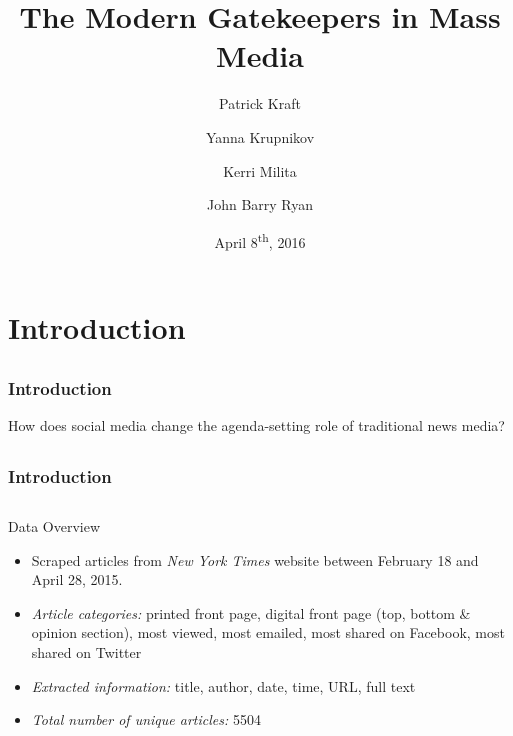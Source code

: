 \documentclass{beamer}
\author[Kraft/Krupnikov/Milita/Ryan]{Patrick Kraft \and Yanna Krupnikov \and Kerri Milita \and John Barry Ryan}
\institute[]{74\textsuperscript{th} MPSA Annual Conference, Chicago, Il}
\title[The Modern Gatekeepers in Mass Media]{The Modern Gatekeepers in Mass Media}
\date{April 8\textsuperscript{th}, 2016}
\begin{document}
\frame{\titlepage}


\section{Introduction}
\subsection{}
\begin{frame}%
\frametitle{Introduction}
\begin{center}
\large{How does social media change the agenda-setting role of traditional news media?}
\end{center}
\end{frame}

\subsection{}
\begin{frame}%
\frametitle{Introduction}
\begin{center}
\end{center}
\end{frame}

\subsection{}
\begin{frame}{Data Overview}
\begin{itemize}
\item Scraped articles from \emph{New York Times} website between February 18 and April 28, 2015.
\item \emph{Article categories:} printed front page, digital front page (top, bottom \& opinion section), most viewed, most emailed, most shared on Facebook, most shared on Twitter
\item \emph{Extracted information:} title, author, date, time, URL, full text
\item \emph{Total number of unique articles:} 5504
\end{itemize}
\end{frame}
\end{document}
